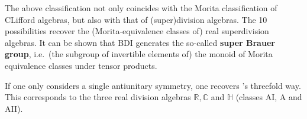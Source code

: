    \begin{remark}
        The above classification not only coincides with the Morita classification of CLifford algebras, but also with that of (super)division algebras. The 10 possibilities recover the (Morita-equivalence classes of) real superdivision algebras. It can be shown that BDI generates the so-called \textbf{super Brauer group}, i.e.~(the subgroup of invertible elements of) the monoid of Morita equivalence classes under tensor products.
    \end{remark}

    \begin{property}
        If one only considers a single antiunitary symmetry, one recovers 's threefold way. This corresponds to the three real division algebras $\mathbb{R},\mathbb{C}$ and $\mathbb{H}$ (classes AI, A and AII).
    \end{property}